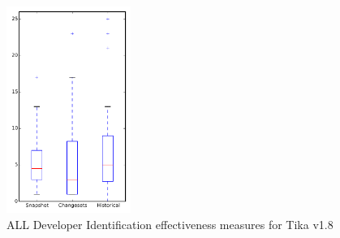 
\begin{figure}[t]
\centering
\includegraphics[width=0.36\textwidth]{figures/dit/all_tika}
\caption{ALL Developer Identification effectiveness measures for Tika v1.8}
\label{fig:dit:all:tika}
\end{figure}

